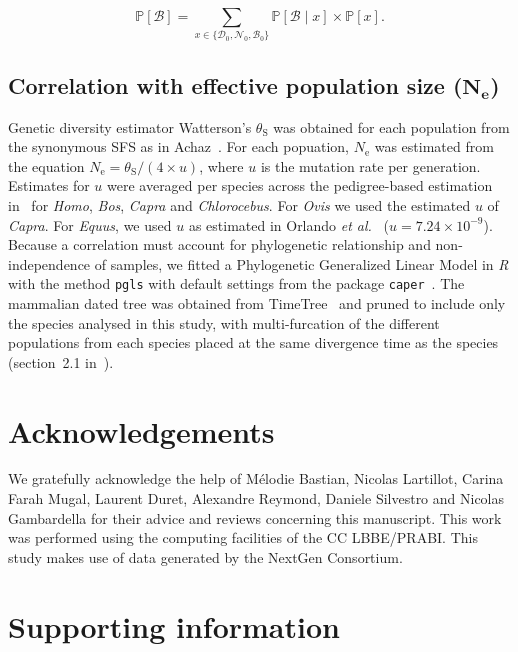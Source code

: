 \documentclass[10pt,letterpaper]{article}
\newcommand{\Ne}{N_{\text{e}}}
\newcommand{\proba}{\mathbb{P}}
\newcommand{\SphyDel}{\mathcal{D}_0}
\newcommand{\SphyNeu}{\mathcal{N}_0}
\newcommand{\SphyBen}{\mathcal{B}_0}
\newcommand{\Sphyclass}{x}
\newcommand{\given}{\mid}
\newcommand{\SpopBen}{\mathcal{B}}
\newcommand{\thetaSyn}{\theta_{\text{S}}}
\begin{document}
\begin{equation}
\proba [ \SpopBen ] = \sum_{\Sphyclass \in \{\SphyDel, \SphyNeu, \SphyBen \} }\proba [\SpopBen \given \Sphyclass ] \times \proba [\Sphyclass ].
\label{eq:total_proba}
\end{equation}

\subsection{Correlation with effective population size (\texorpdfstring{$\bm{\Ne}$}{Nₑ})}
\label{subsec:correlation-diversity}
Genetic diversity estimator Watterson's $\thetaSyn$ was obtained for each population from the synonymous SFS as in Achaz~\cite{achaz_frequency_2009}.
For each popuation, $\Ne$ was estimated from the equation $\Ne=\thetaSyn / (4 \times u)$, where $u$ is the mutation rate per generation.
Estimates for $u$ were averaged per species across the pedigree-based estimation in~\cite{bergeron_evolution_2023} for \textit{Homo}, \textit{Bos}, \textit{Capra} and \textit{Chlorocebus}.
For \textit{Ovis} we used the estimated $u$ of \textit{Capra}.
For \textit{Equus}, we used $u$ as estimated in Orlando \textit{et al.}~\cite{orlando_recalibrating_2013} ($u=7.24\times10^{-9}$).
Because a correlation must account for phylogenetic relationship and non-independence of samples, we fitted a Phylogenetic Generalized Linear Model in \textit{R} with the method \texttt{pgls} with default settings from the package \texttt{caper}~\cite{orme_caper_2013}.
The mammalian dated tree was obtained from TimeTree~\cite{kumar_timetree_2017} and pruned to include only the species analysed in this study, with multi-furcation of the different populations from each species placed at the same divergence time as the species (section~2.1 in~).

\section*{Acknowledgements}
\label{sec:acknowledgment}
We gratefully acknowledge the help of Mélodie Bastian, Nicolas Lartillot, Carina Farah Mugal, Laurent Duret, Alexandre Reymond, Daniele Silvestro and Nicolas Gambardella for their advice and reviews concerning this manuscript.
This work was performed using the computing facilities of the CC LBBE/PRABI\@.
This study makes use of data generated by the NextGen Consortium.

\section*{Supporting information}
\end{document}

